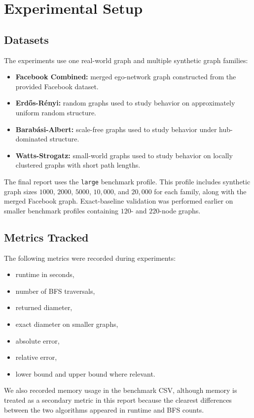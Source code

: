 \documentclass[11pt,a4paper]{article}
\begin{document}
\section{Experimental Setup}

\subsection{Datasets}

The experiments use one real-world graph and multiple synthetic graph families:

\begin{itemize}
    \item \textbf{Facebook Combined:} merged ego-network graph constructed from
    the provided Facebook dataset.
    \item \textbf{Erd\H{o}s-R\'enyi:} random graphs used to study behavior on
    approximately uniform random structure.
    \item \textbf{Barab\'asi-Albert:} scale-free graphs used to study behavior
    under hub-dominated structure.
    \item \textbf{Watts-Strogatz:} small-world graphs used to study behavior on
    locally clustered graphs with short path lengths.
\end{itemize}
The final report uses the \texttt{large} benchmark profile. This profile
includes synthetic graph sizes $1000$, $2000$, $5000$, $10{,}000$, and
$20{,}000$ for each family, along with the merged Facebook graph. Exact-baseline
validation was performed earlier on smaller benchmark profiles containing
$120$- and $220$-node graphs.

\subsection{Metrics Tracked}

The following metrics were recorded during experiments:

\begin{itemize}
    \item runtime in seconds,
    \item number of BFS traversals,
    \item returned diameter,
    \item exact diameter on smaller graphs,
    \item absolute error,
    \item relative error,
    \item lower bound and upper bound where relevant.
\end{itemize}
We also recorded memory usage in the benchmark CSV, although memory is treated
as a secondary metric in this report because the clearest differences between
the two algorithms appeared in runtime and BFS counts.
\end{document}
